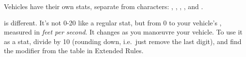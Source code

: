 
Vehicles have their own stats, separate from characters: , , , ,  and .

 is different. It's not 0-20 like a regular stat, but from 0 to your vehicle's , measured in \emph{feet per second}. It changes as you man\oe{}uvre your vehicle. To use it as a stat, divide by 10 (rounding down, i.e.\ just remove the last digit), and find the modifier from the table in Extended Rules.
